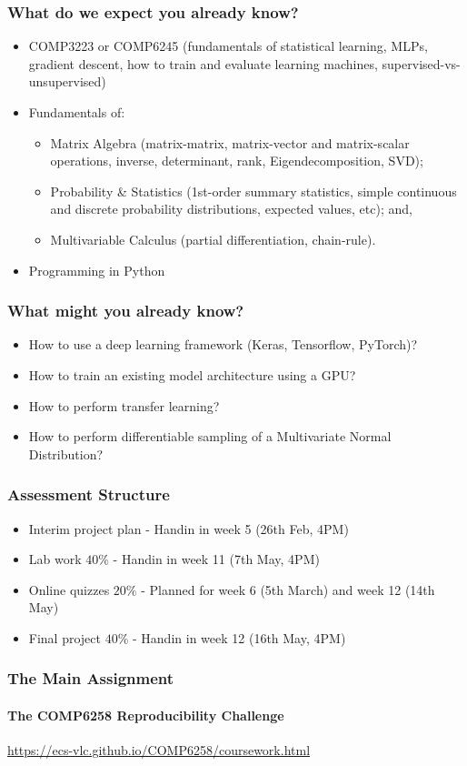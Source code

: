 \documentclass[]{article}
\begin{document}
\begin{frame}
	\frametitle{What do we expect you already know?}

	\begin{itemize}
	\item<+-> COMP3223 or COMP6245 (fundamentals of statistical learning, MLPs, gradient descent, how to train and evaluate learning machines, supervised-vs-unsupervised)
	\item<+-> Fundamentals of:
	\begin{itemize}
		\item Matrix Algebra (matrix-matrix, matrix-vector and matrix-scalar operations, inverse, determinant, rank, Eigendecomposition, SVD);
		\item Probability \& Statistics (1st-order summary statistics, simple continuous and discrete probability distributions, expected values, etc); and,
		\item Multivariable Calculus (partial differentiation, chain-rule).
	\end{itemize}
	\item<+-> Programming in Python
	\end{itemize}
\end{frame}

\begin{frame}
	\frametitle{What might you already know?}
	\begin{itemize}
	\item<+-> How to use a deep learning framework (Keras, Tensorflow, PyTorch)?
	\item<+-> How to train an existing model architecture using a GPU?
	\item<+-> How to perform transfer learning?
	\item<+-> How to perform differentiable sampling of a Multivariate Normal Distribution?
	\end{itemize}
\end{frame}

\begin{frame}
	\frametitle{Assessment Structure}
	\begin{itemize}
		\item Interim project plan - Handin in week 5 (26th Feb, 4PM)
		\item Lab work $40\%$ - Handin in week 11 (7th May, 4PM)
		\item Online quizzes $20\%$ - Planned for week 6 (5th March) and week 12 (14th May)
		\item Final project $40\%$  - Handin in week 12 (16th May, 4PM)
	\end{itemize}
\end{frame}

\begin{frame}
	\frametitle{The Main Assignment}
	\framesubtitle{The COMP6258 Reproducibility Challenge}
	\url{https://ecs-vlc.github.io/COMP6258/coursework.html}
\end{frame}
\end{document}
